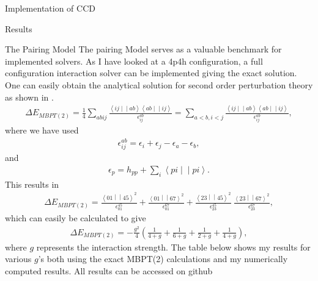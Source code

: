 \documentclass[twoside,english]{uiofysmaster}
\begin{document}
\begin{chapter}{Implementation of CCD}
\end{chapter}



\begin{chapter}{Results}
	
	\begin{section}{The Pairing Model}
		The pairing Model serves as a valuable benchmark for
                implemented solvers. As I have looked at a 4p4h
                configuration, a full configuration interaction solver
                can be implemented giving the exact solution. One can
                easily obtain the analytical  solution for second order
                perturbation theory as shown in \cite{Hjorth-Jensen2016}.
		\begin{align}
			\Delta E_{MBPT(2)} = \frac{1}{4} \sum_{abij} \frac{\left<ij\middle|\middle|ab\right>\left<ab\middle|\middle|ij\right>}{\epsilon_{ij}^{ab}} = 
			\sum_{a<b,i<j} \frac{\left<ij\middle|\middle|ab\right>\left<ab\middle|\middle|ij\right>}{\epsilon_{ij}^{ab}},
		\end{align}
		where we have used
		\begin{align}
			\epsilon_{ij}^{ab} = \epsilon_i + \epsilon_j - \epsilon_a - \epsilon_b,
		\end{align}
		and
		\begin{align}
			\epsilon_p = h_{pp} + \sum_i \left<pi\middle|\middle|pi\right>.
		\end{align}
		This results in
		\begin{align}
			\Delta E_{MBPT(2)} = \frac{\left<01\middle|\middle|45\right>^2}{\epsilon_{01}^{45} } + \frac{\left<01\middle|\middle|67\right>^2}{\epsilon_{01}^{67} }
							  +\frac{\left<23\middle|\middle|45\right>^2}{\epsilon_{23}^{45} } \ \frac{\left<23\middle|\middle|67\right>^2}{\epsilon_{23}^{67} },
		\end{align}
		which can easily be calculated to give
		\begin{align}
			\Delta E_{MBPT(2)} = -\frac{g^2}{4} \left( \frac{1}{4+g} + \frac{1}{6+g} + \frac{1}{2+g} + \frac{1}{4+g} \right),
		\end{align}
		where $g$ represents the interaction strength. The table below shows my results for various $g$'s both using the exact MBPT(2) calculations and my numerically computed results. All results can be accessed on github \cite{WholmenGithub}


\end{section}
\end{chapter}
\end{document}
